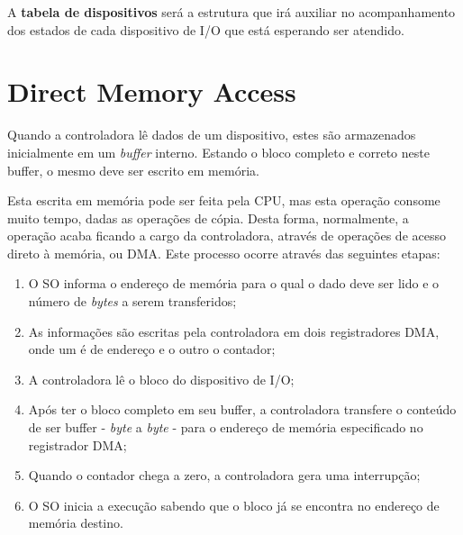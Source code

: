 A \textbf{tabela de dispositivos} será a estrutura que irá auxiliar no acompanhamento dos estados de cada dispositivo de I/O que está esperando ser atendido.






















\section{Direct Memory Access}
Quando a controladora lê dados de um dispositivo, estes são armazenados inicialmente em um \textit{buffer} interno. Estando o bloco completo e correto neste buffer, o mesmo deve ser escrito em memória.

Esta escrita em memória pode ser feita pela CPU, mas esta operação consome muito tempo, dadas as operações de cópia. Desta forma, normalmente, a operação acaba ficando a cargo da controladora, através de operações de acesso direto à memória, ou DMA. Este processo ocorre através das seguintes etapas:

\begin{enumerate}
  \item O SO informa o endereço de memória para o qual o dado deve ser lido e o número de \textit{bytes} a serem transferidos;

  \item As informações são escritas pela controladora em dois registradores DMA, onde um é de endereço e o outro o contador;

  \item A controladora lê o bloco do dispositivo de I/O;

  \item Após ter o bloco completo em seu buffer, a controladora transfere o conteúdo de ser buffer - \textit{byte} a \textit{byte} - para o endereço de memória especificado no registrador DMA;

  \item Quando o contador chega a zero, a controladora gera uma interrupção;

  \item O SO inicia a execução sabendo que o bloco já se encontra no endereço de memória destino.

\end{enumerate}























